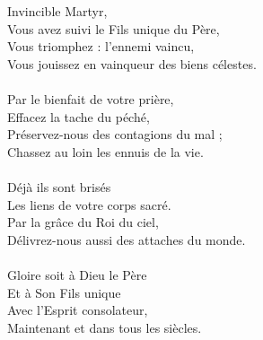 Invincible Martyr,\\
Vous avez suivi le Fils unique du Père,\\
Vous triomphez : l'ennemi vaincu,\\
Vous jouissez en vainqueur des biens célestes.\\
\\
Par le bienfait de votre prière,\\
Effacez la tache du péché,\\
Préservez-nous des contagions du mal ;\\
Chassez au loin les ennuis de la vie.\\
\\
Déjà ils sont brisés\\
Les liens de votre corps sacré.\\
Par la grâce du Roi du ciel,\\
Délivrez-nous aussi des attaches du monde.\\
\\
Gloire soit à Dieu le Père\\
Et à Son Fils unique\\
Avec l'Esprit consolateur,\\
Maintenant et dans tous les siècles.